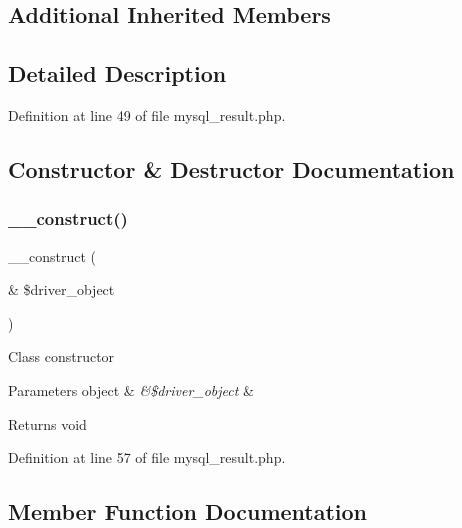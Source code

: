 \subsection*{Additional Inherited Members}


\subsection{Detailed Description}


Definition at line 49 of file mysql\+\_\+result.\+php.



\subsection{Constructor \& Destructor Documentation}
\mbox{\label{class_c_i___d_b__mysql__result_a8e093c8b6e5733bc3f306385ee426ab7}} 
\subsubsection{\texorpdfstring{\_\_construct()}{\_\_construct()}}
{\footnotesize\ttfamily \+\_\+\+\_\+construct (\begin{DoxyParamCaption}\item[{\&}]{\$driver\+\_\+object }\end{DoxyParamCaption})}

Class constructor


\begin{DoxyParams}[1]{Parameters}
object & {\em \&\$driver\+\_\+object} & \\
\hline
\end{DoxyParams}
\begin{DoxyReturn}{Returns}
void 
\end{DoxyReturn}


Definition at line 57 of file mysql\+\_\+result.\+php.



\subsection{Member Function Documentation}
\mbox{\label{class_c_i___d_b__mysql__result_a43a9a92817f1334a1c10752ec44275a0}} 
